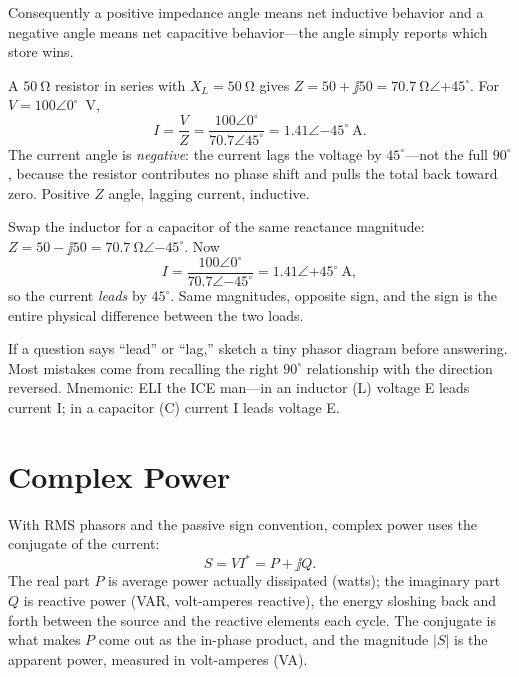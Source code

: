Consequently a positive impedance angle means net inductive behavior and a negative
angle means net capacitive behavior---the angle simply reports which store wins.

\begin{workedbox}
A \(\SI{50}{\ohm}\) resistor in series with \(X_L=\SI{50}{\ohm}\) gives
\(Z=50+\jj50=\SI{70.7}{\ohm}\angle{+45^\circ}\). For \(V=100\angle0^\circ\)~V,
\[
I=\frac{V}{Z}=\frac{100\angle0^\circ}{70.7\angle45^\circ}
=1.41\angle{-45^\circ}\ \si{\ampere}.
\]
The current angle is \emph{negative}: the current lags the voltage by
\(45^\circ\)---not the full \(90^\circ\), because the resistor contributes no phase
shift and pulls the total back toward zero. Positive \(Z\) angle, lagging current,
inductive.
\end{workedbox}

\begin{workedbox}
Swap the inductor for a capacitor of the same reactance magnitude:
\(Z=50-\jj50=\SI{70.7}{\ohm}\angle{-45^\circ}\). Now
\[
I=\frac{100\angle0^\circ}{70.7\angle{-45^\circ}}
=1.41\angle{+45^\circ}\ \si{\ampere},
\]
so the current \emph{leads} by \(45^\circ\). Same magnitudes, opposite sign, and
the sign is the entire physical difference between the two loads.
\end{workedbox}

\begin{exambox}
If a question says ``lead'' or ``lag,'' sketch a tiny phasor diagram before
answering. Most mistakes come from recalling the right \(90^\circ\) relationship
with the direction reversed. Mnemonic: ELI the ICE man---in an inductor (L)
voltage E leads current I; in a capacitor (C) current I leads voltage E.
\end{exambox}

\section{Complex Power}
With RMS phasors and the passive sign convention, complex power uses the
conjugate of the current:
\[
S=V I^{*}=P+\jj Q .
\]
The real part \(P\) is average power actually dissipated (watts); the imaginary
part \(Q\) is reactive power (VAR, volt-amperes reactive), the energy sloshing
back and forth between the source and the reactive elements each cycle. The
conjugate is what makes \(P\) come out as the in-phase product, and the magnitude
\(|S|\) is the apparent power, measured in volt-amperes (VA).

